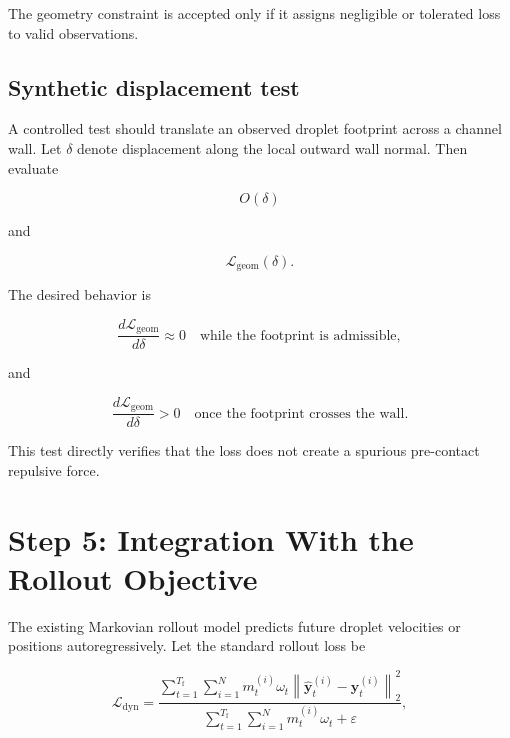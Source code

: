 \documentclass[11pt]{article}
\begin{document}
The geometry constraint is accepted only if it assigns negligible or tolerated loss to valid observations.

\subsection{Synthetic displacement test}

A controlled test should translate an observed droplet footprint across a channel wall. Let $\delta$ denote displacement along the local outward wall normal. Then evaluate

\begin{equation}
    O(\delta)
\end{equation}

and

\begin{equation}
    \mathcal{L}_{\mathrm{geom}}(\delta).
\end{equation}

The desired behavior is

\begin{equation}
    \frac{d\mathcal{L}_{\mathrm{geom}}}{d\delta}
    \approx 0
    \quad
    \text{while the footprint is admissible},
\end{equation}

and

\begin{equation}
    \frac{d\mathcal{L}_{\mathrm{geom}}}{d\delta}
    >0
    \quad
    \text{once the footprint crosses the wall}.
\end{equation}

This test directly verifies that the loss does not create a spurious pre-contact repulsive force.

\section{Step 5: Integration With the Rollout Objective}

The existing Markovian rollout model predicts future droplet velocities or positions autoregressively. Let the standard rollout loss be

\begin{equation}
    \mathcal{L}_{\mathrm{dyn}}
    =
    \frac{
    \sum\limits_{t=1}^{T_{\mathrm{f}}}
    \sum\limits_{i=1}^{N}
    m_{t}^{(i)}
    \omega_{t}
    \left\|
    \hat{\bm{y}}_{t}^{(i)}
    -
    \bm{y}_{t}^{(i)}
    \right\|_{2}^{2}
    }{
    \sum\limits_{t=1}^{T_{\mathrm{f}}}
    \sum\limits_{i=1}^{N}
    m_{t}^{(i)}
    \omega_{t}
    +\varepsilon
    },
\end{equation}
\end{document}
